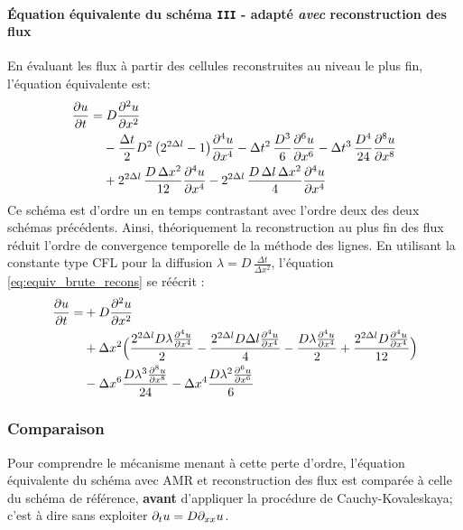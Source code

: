 \paragraph{Équation équivalente du schéma \texttt{III} - adapté \emph{avec} reconstruction des flux}
    En évaluant les flux à partir des cellules reconstruites au niveau le plus fin, l'équation équivalente est:
    \begin{align}\label{eq:equiv_brute_recons}
        \frac{\partial u}{\partial t} =&\; D \frac{\partial^2 u}{\partial x^2} \\\notag
        &- \frac{\Delta t}{2} D^2\, \bigl( 2^{2\Delta l}- 1 \bigr)          \frac{\partial^4 u}{\partial x^4}
        - \Delta t^2\, \frac{D^3}{6}          \frac{\partial^6 u}{\partial x^6}
        - \Delta t^3\, \frac{D^4}{24}         \frac{\partial^8 u}{\partial x^8} \\\notag
        &+ 2^{2\Delta l}\, \frac{D\, \Delta x^2}{12}    \frac{\partial^4 u}{\partial x^4}
        - 2^{2\Delta l}\, \frac{D\, \Delta l\, \Delta x^2}{4} \frac{\partial^4 u}{\partial x^4}
    \end{align}
    Ce schéma est d'ordre un en temps contrastant avec l'ordre deux des deux schémas précédents.
    Ainsi, théoriquement la reconstruction au plus fin des flux réduit l'ordre de convergence temporelle de la méthode des lignes.
    En utilisant la constante type CFL pour la diffusion $\lambda = D\,\frac{\Delta t}{\Delta x^2}$, l'équation \eqref{eq:equiv_brute_recons} se réécrit : 
    \begin{align}\label{eq:equiv_cfl_recons}
        \frac{\partial u}{\partial t}
        =&+ D \frac{\partial^{2}u}{\partial x^{2}}\\\notag
        &+ \Delta x^{2}\Bigl(\frac{2^{2 \Delta l} D  \lambda \frac{\partial^{4}u}{\partial x^{4}}}{2} 
        -  \frac{2^{2 \Delta l} D \Delta l \frac{\partial^{4}u}{\partial x^{4}}}{4} 
        -  \frac{D \lambda \frac{\partial^{4}u}{\partial x^{4}}}{2} 
        +  \frac{2^{2 \Delta l} D\frac{\partial^{4}u}{\partial x^{4}}}{12}\Bigr)\\\notag
        &- \Delta x^{6} \frac{D \lambda^{3} \frac{\partial^{8}u}{\partial x^{8}}}{24} 
        - \Delta x^{4} \frac{D \lambda^{2} \frac{\partial^{6}u}{\partial x^{6}}}{6} 
    \end{align}
\subsubsection{Comparaison}
    Pour comprendre le mécanisme menant à cette perte d'ordre,
    l'équation équivalente du schéma avec AMR et reconstruction des flux est comparée à celle du schéma de référence, 
    \textbf{avant} d'appliquer la procédure de Cauchy-Kovaleskaya; c'est à dire sans exploiter $\partial_t u=D \partial_{xx} u$.
